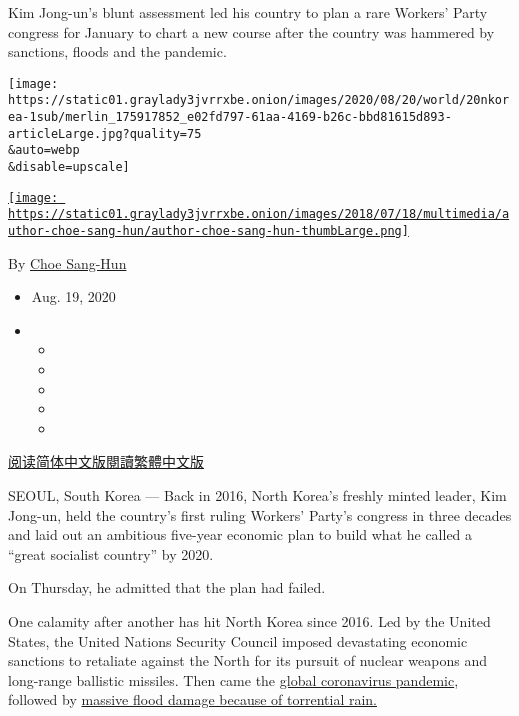 Kim Jong-un's blunt assessment led his country to plan a rare Workers'
Party congress for January to chart a new course after the country was
hammered by sanctions, floods and the pandemic.

\texttt{[image: https://static01.graylady3jvrrxbe.onion/images/2020/08/20/world/20nkorea-1sub/merlin\_175917852\_e02fd797-61aa-4169-b26c-bbd81615d893-articleLarge.jpg?quality=75\\\&auto=webp\\\&disable=upscale]}

\href{https://www.nytimes3xbfgragh.onion/by/choe-sang-hun}{\texttt{[image: https://static01.graylady3jvrrxbe.onion/images/2018/07/18/multimedia/author-choe-sang-hun/author-choe-sang-hun-thumbLarge.png]}}

By \href{https://www.nytimes3xbfgragh.onion/by/choe-sang-hun}{Choe
Sang-Hun}

\begin{itemize}
\item
  Aug. 19, 2020
\item
  \begin{itemize}
  \item
  \item
  \item
  \item
  \item
  \end{itemize}
\end{itemize}

\href{https://cn.nytimes3xbfgragh.onion/asia-pacific/20200821/north-korea-economy-coronavirus/}{阅读简体中文版}\href{https://cn.nytimes3xbfgragh.onion/asia-pacific/20200821/north-korea-economy-coronavirus/zh-hant/}{閱讀繁體中文版}

SEOUL, South Korea --- Back in 2016, North Korea's freshly minted
leader, Kim Jong-un, held the country's first ruling Workers' Party's
congress in three decades and laid out an ambitious five-year economic
plan to build what he called a ``great socialist country'' by 2020.

On Thursday, he admitted that the plan had failed.

One calamity after another has hit North Korea since 2016. Led by the
United States, the United Nations Security Council imposed devastating
economic sanctions to retaliate against the North for its pursuit of
nuclear weapons and long-range ballistic missiles. Then came the
\href{https://www.nytimes3xbfgragh.onion/2020/07/04/world/asia/north-korea-sanctions-coronavirus.html}{global
coronavirus pandemic}, followed by
\href{https://www.nytimes3xbfgragh.onion/2020/08/14/world/asia/north-korea-floods-coronavirus.html}{massive
flood damage because of torrential rain.}

